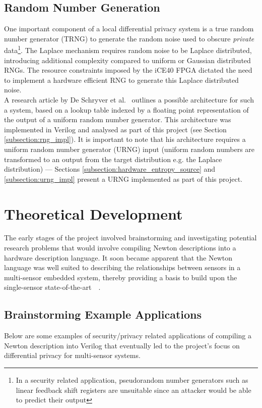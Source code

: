 \documentclass[12pt]{article}
\begin{document}
  \subsection{Random Number Generation} \label{subsection:intro_rng}
    One important component of a local differential privacy system is a true random number generator (TRNG) to generate the random noise used to obscure \textit{private} data\footnote{In a security related application, pseudorandom number generators such as linear feedback shift registers are unsuitable since an attacker would be able to predict their output}. The Laplace mechanism requires random noise to be Laplace distributed, introducing additional complexity compared to uniform or Gaussian distributed RNGs. The resource constraints imposed by the iCE40 FPGA dictated the need to implement a hardware efficient RNG to generate this Laplace distributed noise.\\

    A research article by De Schryver et al.~\cite{DeSchryver} outlines a possible architecture for such a system, based on a lookup table indexed by a floating point representation of the output of a uniform random number generator. This architecture was implemented in Verilog and analysed as part of this project (see Section \ref{subsection:rng_impl}). It is important to note that his architecture requires a uniform random number generator (URNG) input (uniform random numbers are transformed to an output from the target distribution e.g. the Laplace distribution) --- Sections \ref{subsection:hardware_entropy_source} and \ref{subsection:urng_impl} present a URNG implemented as part of this project.

\newpage



%
%

\section{Theoretical Development}
  The early stages of the project involved brainstorming and investigating potential research problems that would involve compiling Newton descriptions into a hardware description language. It soon became apparent that the Newton language was well suited to describing the relationships between sensors in a multi-sensor embedded system, thereby providing a basis to build upon the single-sensor state-of-the-art~\cite{Choi2018GuaranteeingLD}~\cite{diffpriv_2006}.
  \subsection{Brainstorming Example Applications}
    Below are some examples of security/privacy related applications of compiling a Newton description into Verilog that eventually led to the project's focus on differential privacy for multi-sensor systems.
\end{document}
